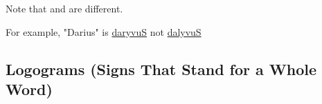 \begin{marker}
    Note that  and
     are different.

    For example, "Darius" is
    \href{https://en.wiktionary.org/wiki/%F0%90%8E%AD%F0%90%8E%A0%F0%90%8E%BC%F0%90%8E%B9%F0%90%8E%BA%F0%90%8E%A2%F0%90%8F%81}{\oldpersian daryvuS}
    not
    \href{https://en.wiktionary.org/wiki/%F0%90%8E%AD%F0%90%8E%A0%F0%90%8E%BE%F0%90%8E%B9%F0%90%8E%BA%F0%90%8E%A2%F0%90%8F%81}{\oldpersian dalyvuS}
\end{marker}

\subsection{Logograms (Signs That Stand for a Whole Word)}

 \space\space\space\space\space
{} \space\space\space\space\space
{} \space\space\space\space\space
{} \space\space\space\space\space
{} \space\space\space\space\space
{} \space\space\space\space\space
